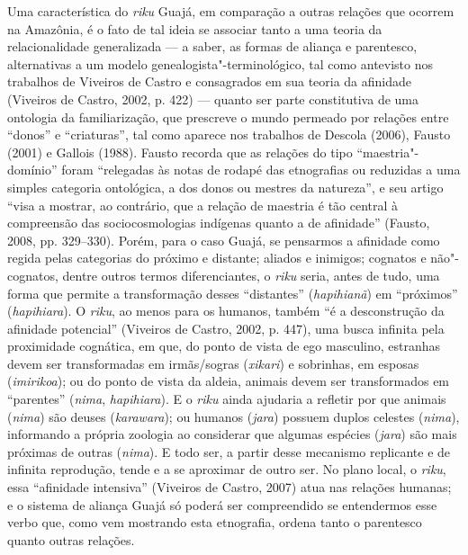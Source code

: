 Uma característica do \emph{riku} Guajá, em comparação a outras relações
que ocorrem na Amazônia, é o fato de tal ideia se associar tanto a uma
teoria da relacionalidade generalizada --- a saber, as formas de aliança e
parentesco, alternativas a um modelo genealogista"-terminológico, tal
como antevisto nos trabalhos de Viveiros de Castro e consagrados em sua
teoria da afinidade (Viveiros de Castro, 2002, p. 422) --- quanto ser
parte constitutiva de uma ontologia da familiarização, que prescreve o
mundo permeado por relações entre ``donos'' e ``criaturas'', tal como
aparece nos trabalhos de Descola (2006), Fausto (2001) e Gallois (1988).
Fausto recorda que as relações do tipo ``maestria"-domínio'' foram
``relegadas às notas de rodapé das etnografias ou reduzidas a uma simples
categoria ontológica, a dos donos ou mestres da natureza'', e seu artigo
``visa a mostrar, ao contrário, que a relação de maestria é tão central à
compreensão das sociocosmologias indígenas quanto a de afinidade''
(Fausto, 2008, pp. 329--330). Porém, para o caso Guajá, se pensarmos a
afinidade como regida pelas categorias do próximo e distante; aliados e
inimigos; cognatos e não"-cognatos, dentre outros termos diferenciantes,
o \emph{riku} seria, antes de tudo, uma forma que permite a
transformação desses ``distantes'' (\emph{hapihianã}) em ``próximos''
(\emph{hapihiara}). O \emph{riku}, ao menos para os humanos, também ``é a
desconstrução da afinidade potencial'' (Viveiros de Castro, 2002, p.
447), uma busca infinita pela proximidade cognática, em que, do ponto de
vista de ego masculino, estranhas devem ser transformadas em
irmãs/sogras (\emph{xikari}) e sobrinhas, em esposas (\emph{imirikoa});
ou do ponto de vista da aldeia, animais devem ser transformados em
``parentes'' (\emph{nima}, \emph{hapihiara}). E o \emph{riku} ainda
ajudaria a refletir por que animais (\emph{nima}) são deuses
(\emph{karawara}); ou humanos (\emph{jara}) possuem duplos celestes
(\emph{nima}), informando a própria zoologia ao considerar que algumas
espécies (\emph{jara}) são mais próximas de outras (\emph{nima}). E todo
ser, a partir desse mecanismo replicante e de infinita reprodução, tende
e a se aproximar de outro ser. No plano local, o \emph{riku}, essa
``afinidade intensiva'' (Viveiros de Castro, 2007) atua nas relações
humanas; e o sistema de aliança Guajá só poderá ser compreendido se
entendermos esse verbo que, como vem mostrando esta etnografia, ordena
tanto o parentesco quanto outras relações.


